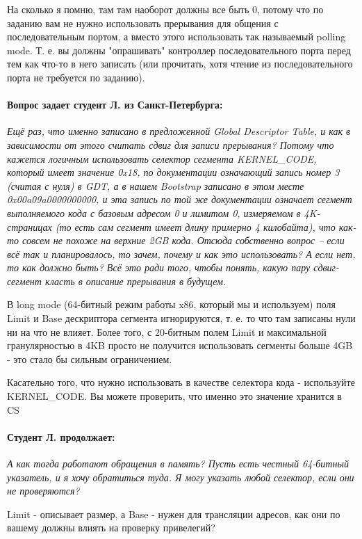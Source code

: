 На сколько я помню, там там наоборот должны все быть 0, потому что по заданию
вам не нужно использовать прерывания для общения с последовательным портом, а
вместо этого использовать так называемый polling mode. Т. е. вы должны
"опрашивать" контроллер последовательного порта перед тем как что-то в него
записать (или прочитать, хотя чтение из последовательного порта не требуется по
заданию).

\paragraph{Вопрос задает студент Л. из Санкт-Петербурга:}\emph{Ещё раз, что
именно записано в предложенной Global Descriptor Table, и как в зависимости от
этого считать сдвиг для записи прерывания? Потому что кажется логичным
использовать селектор сегмента KERNEL\_CODE, который имеет значение 0x18, по
документации означающий запись номер 3 (считая с нуля) в GDT, а в нашем
Bootstrap записано в этом месте 0x00a09a0000000000, и эта запись по той же
документации означает сегмент выполняемого кода с базовым адресом 0 и лимитом 0,
измеряемом в 4K-страницах (то есть сам сегмент имеет длину примерно 4
килобайта), что как-то совсем не похоже на верхние 2GB кода. Отсюда собственно
вопрос -- если всё так и планировалось, то зачем, почему и как это использовать?
А если нет, то как должно быть? Всё это ради того, чтобы понять, какую пару
сдвиг-сегмент класть в описание прерывания в будущем.}

В long mode (64-битный режим работы x86, который мы и используем) поля Limit и
Base дескриптора сегмента игнорируются, т. е. то что там записаны нули ни на что
не влияет. Более того, с 20-битным полем Limit и максимальной гранулярностью в
4KB просто не получится использовать сегменты больше 4GB - это стало бы сильным
ограничением.

Касательно того, что нужно использовать в качестве селектора кода - используйте
KERNEL\_CODE. Вы можете проверить, что именно это значение хранится в CS

\paragraph{Студент Л. продолжает:}\emph{А как тогда работают обращения в память?
Пусть есть честный 64-битный указатель, и я хочу обратиться туда. Я могу указать
любой селектор, если они не проверяются?}

Limit - описывает размер, а Base - нужен для трансляции адресов, как они по
вашему должны влиять на проверку привелегий?

